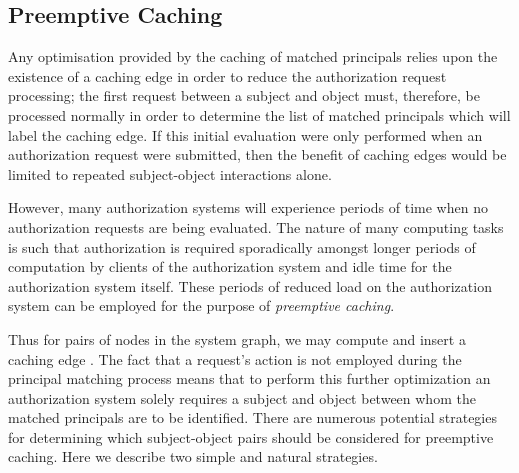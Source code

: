 \documentclass{article}
\begin{document}
\subsection{Preemptive Caching}\label{sec:caching:preemptive}
Any optimisation provided by the caching of matched principals relies upon the existence of a caching edge in order to reduce the authorization request processing; the first request between a subject and object must, therefore, be processed normally in order to determine the list of matched principals which will label the caching edge.
If this initial evaluation were only performed when an authorization request were submitted, then the benefit of caching edges would be limited to repeated subject-object interactions alone.

However, many authorization systems will experience periods of time when no authorization requests are being evaluated.
The nature of many computing tasks is such that authorization is required sporadically amongst longer periods of computation by clients of the authorization system and idle time for the authorization system itself.
These periods of reduced load on the authorization system can be employed for the purpose of \emph{preemptive caching}.

Thus for pairs of nodes  in the system graph, we may compute  and insert a caching edge .
The fact that a request's action is not employed during the principal matching process means that to perform this further optimization an authorization system solely requires a subject and object between whom the matched principals are to be identified.
There are numerous potential strategies for determining which subject-object pairs should be considered for preemptive caching.
Here we describe two simple and natural strategies.
\end{document}
